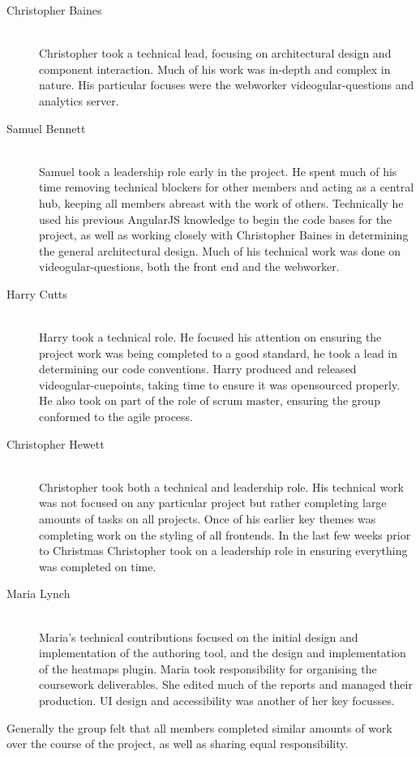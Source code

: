 \begin{description}
  \item[Christopher Baines] \hfill \\
  	Christopher took a technical lead, focusing on architectural design and component interaction. Much of his work was in-depth and complex in nature. His particular focuses were the webworker videogular-questions and analytics server.
  \item[Samuel Bennett] \hfill \\
  	Samuel took a leadership role early in the project. He spent much of his time removing technical blockers for other members and acting as a central hub, keeping all members abreast with the work of others. Technically he used his previous AngularJS knowledge to begin the code bases for the project, as well as working closely with Christopher Baines in determining the general architectural design. Much of his technical work was done on videogular-questions, both the front end and the webworker.
  \item[Harry Cutts] \hfill \\
  	Harry took a technical role. He focused his attention on ensuring the project work was being completed to a good standard, he took a lead in determining our code conventions. Harry produced and released videogular-cuepoints, taking time to ensure it was opensourced properly.  He also took on part of the role of scrum master, ensuring the group conformed to the agile process.
  \item[Christopher Hewett] \hfill \\
  	Christopher took both a technical and leadership role. His technical work was not focused on any particular project but rather completing large amounts of tasks on all projects. Once of his earlier key themes was completing work on the styling of all frontends. In the last few weeks prior to Christmas Christopher took on a leadership role in ensuring everything was completed on time.
  \item[Maria Lynch] \hfill \\
  	Maria's technical contributions focused on the initial design and implementation of the authoring tool, and the design and implementation of the heatmaps plugin. Maria took responsibility for organising the coursework deliverables. She edited much of the reports and managed their production. UI design and accessibility was another of her key focusses.
\end{description}

Generally the group felt that all members completed similar amounts of work over the course of the project, as well as sharing equal responsibility.

